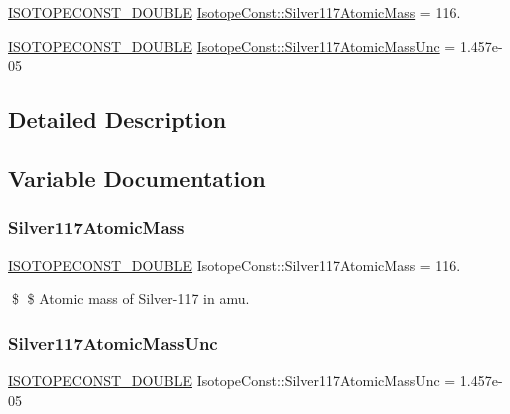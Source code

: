 \begin{DoxyCompactItemize}
\item 
\mbox{\hyperlink{group___isotope_const-_macros_ga8f45a7272ce02c0b4c65c44636ed719a}{I\+S\+O\+T\+O\+P\+E\+C\+O\+N\+S\+T\+\_\+\+D\+O\+U\+B\+LE}} \mbox{\hyperlink{group___isotope_const-_silver-_ag117_gaa657bcaeb513f6c26d5bd3d2194318e6}{Isotope\+Const\+::\+Silver117\+Atomic\+Mass}} = 116.
\item 
\mbox{\hyperlink{group___isotope_const-_macros_ga8f45a7272ce02c0b4c65c44636ed719a}{I\+S\+O\+T\+O\+P\+E\+C\+O\+N\+S\+T\+\_\+\+D\+O\+U\+B\+LE}} \mbox{\hyperlink{group___isotope_const-_silver-_ag117_ga002b93d57874066e92804aafaebf6705}{Isotope\+Const\+::\+Silver117\+Atomic\+Mass\+Unc}} = 1.\+457e-\/05
\end{DoxyCompactItemize}


\subsection{Detailed Description}


\subsection{Variable Documentation}
\mbox{\label{group___isotope_const-_silver-_ag117_gaa657bcaeb513f6c26d5bd3d2194318e6}} 
\subsubsection{\texorpdfstring{Silver117\+Atomic\+Mass}{Silver117AtomicMass}}
{\footnotesize\ttfamily \mbox{\hyperlink{group___isotope_const-_macros_ga8f45a7272ce02c0b4c65c44636ed719a}{I\+S\+O\+T\+O\+P\+E\+C\+O\+N\+S\+T\+\_\+\+D\+O\+U\+B\+LE}} Isotope\+Const\+::\+Silver117\+Atomic\+Mass = 116.}

\$ \$ Atomic mass of Silver-\/117 in amu. \mbox{\label{group___isotope_const-_silver-_ag117_ga002b93d57874066e92804aafaebf6705}} 
\subsubsection{\texorpdfstring{Silver117\+Atomic\+Mass\+Unc}{Silver117AtomicMassUnc}}
{\footnotesize\ttfamily \mbox{\hyperlink{group___isotope_const-_macros_ga8f45a7272ce02c0b4c65c44636ed719a}{I\+S\+O\+T\+O\+P\+E\+C\+O\+N\+S\+T\+\_\+\+D\+O\+U\+B\+LE}} Isotope\+Const\+::\+Silver117\+Atomic\+Mass\+Unc = 1.\+457e-\/05}

